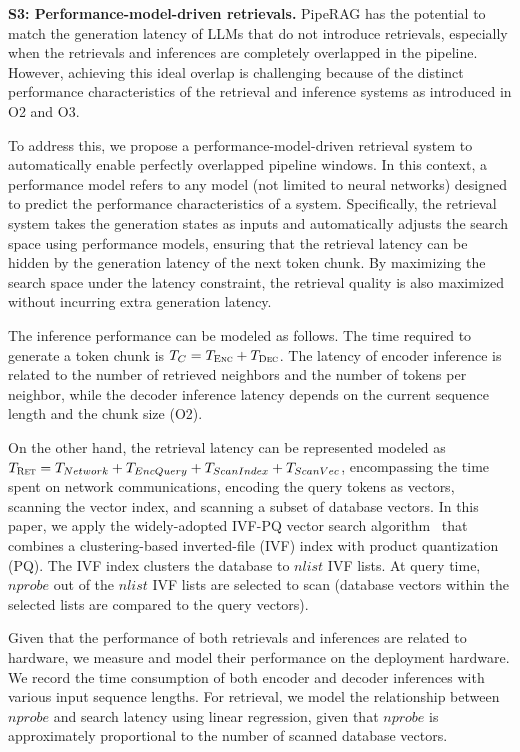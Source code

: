 \textbf{S3: Performance-model-driven retrievals.} 
PipeRAG has the potential to match the generation latency of LLMs that do not introduce retrievals, especially when the retrievals and inferences are completely overlapped in the pipeline.
However, achieving this ideal overlap is challenging because of the distinct performance characteristics of the retrieval and inference systems as introduced in O2 and O3. 

To address this, we propose a performance-model-driven retrieval system to automatically enable perfectly overlapped pipeline windows.
In this context, a performance model refers to any model (not limited to neural networks) designed to predict the performance characteristics of a system.
Specifically, the retrieval system takes the generation states as inputs and automatically adjusts the search space using performance models, ensuring that the retrieval latency can be hidden by the generation latency of the next token chunk. By maximizing the search space under the latency constraint, the retrieval quality is also maximized without incurring extra generation latency.

The inference performance can be modeled as follows. 
The time required to generate a token chunk is \( T_{C} = T_{\textsc{Enc}} + T_{\textsc{Dec}} \). The latency of encoder inference is related to the number of retrieved neighbors and the number of tokens per neighbor, while the decoder inference latency depends on the current sequence length and the chunk size (O2). 

On the other hand, the retrieval latency can be represented modeled as \( T_{\textsc{Ret}} = T_{Network} + T_{EncQuery} + T_{ScanIndex} + T_{ScanVec}\), encompassing the time spent on network communications, encoding the query tokens as vectors, scanning the vector index, and scanning a subset of database vectors. 
In this paper, we apply the widely-adopted IVF-PQ vector search algorithm~\cite{PQ} that combines a clustering-based inverted-file (IVF) index with product quantization (PQ). The IVF index clusters the database to \( nlist \) IVF lists. At query time, \( nprobe \) out of the \( nlist \) IVF lists are selected to scan (database vectors within the selected lists are compared to the query vectors). 

Given that the performance of both retrievals and inferences are related to hardware, we measure and model their performance on the deployment hardware. We record the time consumption of both encoder and decoder inferences with various input sequence lengths. For retrieval, we model the relationship between \( nprobe \) and search latency using linear regression, given that \( nprobe \) is approximately proportional to the number of scanned database vectors.

